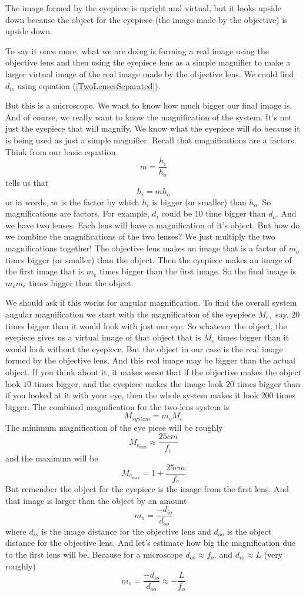 \documentclass{article}
\begin{document}
The image formed by the eyepiece is upright and virtual, but it looks upside
down because the object for the eyepiece (the image made by the objective)
is upside down.

To say it once more, what we are doing is forming a real image using the
objective lens and then using the eyepiece lens as a simple magnifier to
make a larger virtual image of the real image made by the objective lens. We
could find $d_{ie}$ using equation (\ref{TwoLensesSeparated}).

But this is a microscope. We want to know how much bigger our final image
is. And of course, we really want to know the magnification of the system.
It's not just the eyepiece that will magnify. We know what the eyepiece will
do because it is being used as just a simple magnifier. Recall that
magnifications are a factors. Think from our basic equation 
\[
m=\frac{h_{i}}{h_{o}}
\]%
tells us that 
\[
h_{i}=mh_{o}
\]%
or in words, $m$ is the factor by which $h_{i}$ is bigger (or smaller) than $%
h_{o}.$ So magnifications are factors. For example, $d_{i}$ could be $10$
time bigger than $d_{o}$. And we have two lenses. Each lens will have a
magnification of it's object. But how do we combine the magnifications of
the two lenses? We just multiply the two magnifications together! The
objective lens makes an image that is a factor of $m_{o}$ times bigger (or
smaller) than the object. Then the eyepiece makes an image of the first
image that is $m_{e}$ times bigger than the first image. So the final image
is $m_{o}m_{e}$ times bigger than the object.

We should ask if this works for angular magnification. To find the overall
system angular magnification we start with the magnification of the eyepiece 
$M_{e},$ say, $20$ times bigger than it would look with just our eye. So
whatever the object, the eyepiece gives us a virtual image of that object
that is $M_{e}$ times bigger than it would look without the eyepiece. But
the object in our case is the real image formed by the objective lens. And
this real image may be bigger than the actual object. If you think about it,
it makes sense that if the objective makes the object look $10$ times
bigger, and the eyepiece makes the image look $20$ times bigger than if you
looked at it with your eye, then the whole system makes it look $200$ times
bigger. The combined magnification for the two-lens system is 
\begin{equation}
M_{system}=m_{o}M_{e}
\end{equation}%
The minimum magnification of the eye piece will be roughly 
\[
M_{e_{\min }}\approx \frac{25\unit{cm}}{f_{e}}
\]%
and the maximum will be 
\[
M_{e_{\max }}=1+\frac{25\unit{cm}}{f_{e}}
\]%
But remember the object for the eyepiece is the image from the first lens.
And that image is larger than the object by an amount \ 
\[
m_{o}=\frac{-d_{io}}{d_{oo}}
\]%
where $d_{io}$ is the image distance for the objective lens and $d_{oo}$ is
the object distance for the objective lens. And let's estimate how big the
magnification due to the first lens will be. Because for a microscope $%
d_{oo}\approx f_{o}.$ and $d_{io}\approx L$ (very roughly) 
\[
m_{o}=\frac{-d_{io}}{d_{oo}}\approx -\frac{L}{f_{o}}
\]
\end{document}

